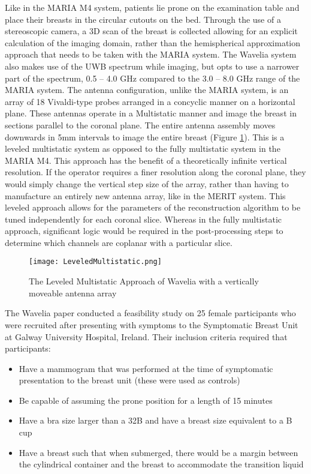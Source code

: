 Like in the MARIA M4 system, patients lie prone on the examination table and place their breasts in the circular cutouts
on the bed. Through the use of a stereoscopic camera, a 3D scan of the breast is collected allowing for an explicit
calculation of the imaging domain, rather than the hemispherical approximation approach that needs to be taken with the
MARIA system. The Wavelia system also makes use of the UWB spectrum while imaging, but opts to use a narrower part of
the spectrum, 0.5 -- 4.0 GHz compared to the 3.0 -- 8.0 GHz range of the MARIA system. The antenna configuration, unlike
the MARIA system, is an array of 18 Vivaldi-type probes arranged in a concyclic manner on a horizontal plane. These
antennas operate in a Multistatic manner and image the breast in sections parallel to the coronal plane. The entire
antenna assembly moves downwards in 5mm intervals to image the entire breast (Figure
\ref{fig:LeveledMultistaticExample}). This is a leveled multistatic system as opposed to the fully multistatic system in
the MARIA M4. This approach has the benefit of a theoretically infinite vertical resolution. If the operator requires
a finer resolution along the coronal plane, they would simply change the vertical step size of the array, rather than
having to manufacture an entirely new antenna array, like in the MERIT system. This leveled approach allows for the
parameters of the reconstruction algorithm to be tuned independently for each coronal slice. Whereas in the fully
multistatic approach, significant logic would be required in the post-processing steps to determine which channels are
coplanar with a particular slice. \hfill \break
\begin{figure}
    \texttt{[image: LeveledMultistatic.png]}
    \centering
    \caption{The Leveled Multistatic Approach of Wavelia with a vertically moveable antenna array \cite{moloneyWaveliaMicrowaveBreast2021}}
    \label{fig:LeveledMultistaticExample}
\end{figure}
The Wavelia paper \cite{moloneyWaveliaMicrowaveBreast2021} conducted a feasibility study on 25 female
participants who were recruited after presenting with symptoms to the Symptomatic Breast Unit at Galway University
Hospital, Ireland. Their inclusion criteria required that participants:
\begin{itemize}
    \item Have a mammogram that was performed at the time of symptomatic presentation to the breast unit (these were
    used as controls)
    \item Be capable of assuming the prone position for a length of 15 minutes
    \item Have a bra size larger than a 32B and have a breast size equivalent to a B cup
    \item Have a breast such that when submerged, there would be a margin between the cylindrical container and the
    breast to accommodate the transition liquid 
\end{itemize}
